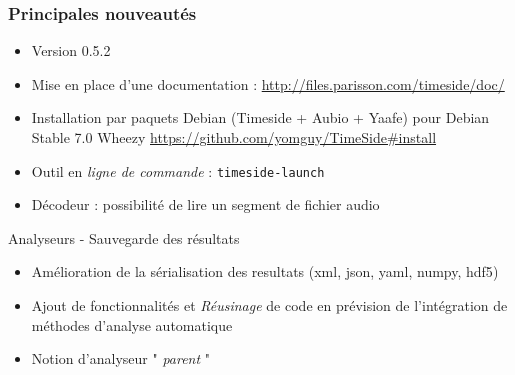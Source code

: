 \documentclass[10pt, final, hyperref, table]{beamer}
\begin{document}
\begin{frame}
  \frametitle{Principales nouveautés}
  \begin{block}{}
    \begin{itemize}
    \item Version 0.5.2
    \item Mise en place d'une documentation :
      \url{http://files.parisson.com/timeside/doc/}
   
    \item Installation par paquets Debian (Timeside + Aubio + Yaafe)
      pour Debian Stable 7.0 Wheezy
      \url{https://github.com/yomguy/TimeSide\#install}
    \item Outil en \emph{ligne de commande} : \texttt{timeside-launch}
    \item Décodeur : possibilité de lire un \alert{segment} de fichier audio
    \end{itemize}
  \end{block}
  \begin{block}{Analyseurs - Sauvegarde des résultats}
    \begin{itemize}
    \item Amélioration de la sérialisation des resultats (xml, json,
      yaml, \alert{numpy}, \alert{hdf5})
    \item  Ajout de fonctionnalités et \emph{Réusinage} de code en prévision de l'intégration de méthodes d'analyse automatique
    \item Notion d'analyseur " \emph{parent} "
    \end{itemize}
    
  \end{block}
\end{frame}
\end{document}
